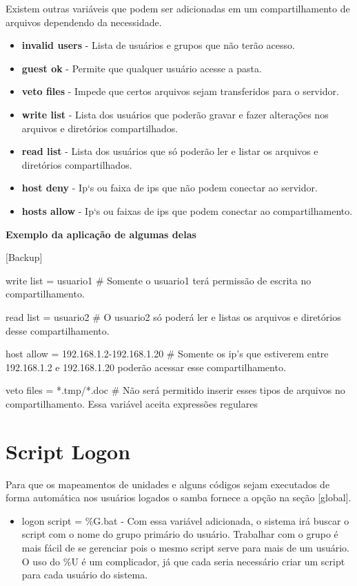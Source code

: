 Existem outras variáveis que podem ser adicionadas em um compartilhamento de arquivos dependendo da necessidade.

\begin{itemize}
	\item \textbf{invalid users} - Lista de usuários e grupos que não terão acesso.
	\item \textbf{guest ok} - Permite que qualquer usuário acesse a pasta.
	\item \textbf{veto files} - Impede que certos arquivos sejam transferidos para o servidor.
	\item \textbf{write list} - Lista dos usuários que poderão gravar e fazer alterações nos arquivos e diretórios compartilhados.
	\item \textbf{read list} - Lista dos usuários que só poderão ler e listar os arquivos e diretórios compartilhados.
	\item \textbf{host deny} - Ip`s ou faixa de ips que não podem conectar ao servidor.
	\item \textbf{hosts allow} - Ip`s ou faixas de ips que podem conectar ao compartilhamento.
\end{itemize}

\textbf{Exemplo da aplicação de algumas delas}

[Backup]

write list = usuario1 \# Somente o usuario1 terá permissão de escrita no compartilhamento.

read list = usuario2 \# O usuario2 só poderá ler e listas os arquivos e diretórios desse compartilhamento.

host allow = 192.168.1.2-192.168.1.20 \# Somente os ip's que estiverem entre 192.168.1.2 e 192.168.1.20 poderão acessar esse compartilhamento.

veto files = *.tmp/*.doc \# Não será permitido inserir esses tipos de arquivos no compartilhamento. Essa variável aceita expressões regulares

\section{Script Logon}

Para que os mapeamentos de unidades e alguns códigos sejam executados de forma automática nos usuários logados o samba fornece a opção na seção [global]. 

\begin{itemize}
	\item {logon script = \%G.bat } - Com essa variável adicionada, o sistema irá buscar o script com o nome do grupo primário do usuário. Trabalhar com o grupo é mais fácil de se gerenciar pois o mesmo script serve para mais de um usuário. O uso do \%U é um complicador, já que cada seria necessário criar um script para cada usuário do sistema.
\end{itemize}

